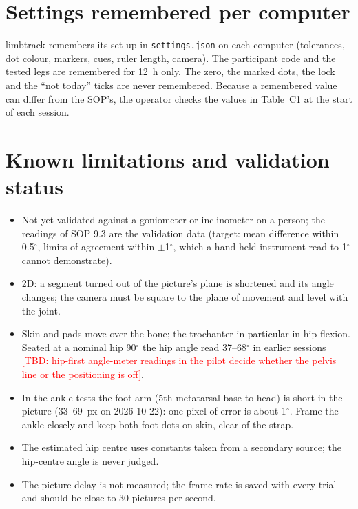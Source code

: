 \documentclass[a4paper,10pt]{article}
\newcommand{\lt}{\textsf{limbtrack}}
\newcommand{\code}[1]{\texttt{#1}}
\newcommand{\dg}{\ensuremath{^\circ}}
\newcommand{\tbd}[1]{\textcolor{red}{[TBD: #1]}}
\begin{document}
\section{Settings remembered per computer}
\lt{} remembers its set-up in \code{settings.json} on each computer (tolerances, dot colour, markers, cues, ruler length, camera). The
participant code and the tested legs are remembered for 12~h only. The zero, the marked dots, the lock and the ``not today'' ticks are
never remembered. Because a remembered value can differ from the SOP's, the operator checks the values in Table~C1 at the start of each
session.

\section{Known limitations and validation status}\label{sec:limits}
\begin{itemize}
\item Not yet validated against a goniometer or inclinometer on a person; the readings of SOP 9.3 are the validation data (target:
  mean difference within 0.5\dg, limits of agreement within $\pm$1\dg, which a hand-held instrument read to 1\dg{} cannot demonstrate).
\item 2D: a segment turned out of the picture's plane is shortened and its angle changes; the camera must be square to the plane of
  movement and level with the joint.
\item Skin and pads move over the bone; the trochanter in particular in hip flexion. Seated at a nominal hip 90\dg{} the hip angle read
  37--68\dg{} in earlier sessions \tbd{hip-first angle-meter readings in the pilot decide whether the pelvis line or the positioning is off}.
\item In the ankle tests the foot arm (5th metatarsal base to head) is short in the picture (33--69~px on 2026-10-22): one pixel of
  error is about 1\dg. Frame the ankle closely and keep both foot dots on skin, clear of the strap.
\item The estimated hip centre uses constants taken from a secondary source; the hip-centre angle is never judged.
\item The picture delay is not measured; the frame rate is saved with every trial and should be close to 30 pictures per second.
\end{itemize}

\end{document}
